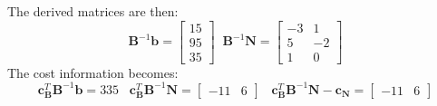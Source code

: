 \begin{example}
\begin{displaymath}
\end{displaymath}
The derived matrices are then:
\begin{displaymath}
\mathbf{B}^{-1}\mathbf{b} = \begin{bmatrix}15\\95\\35\end{bmatrix}\;\;
\mathbf{B}^{-1}\mathbf{N} = \begin{bmatrix}
-3 & 1\\
5 & -2\\
1 & 0
\end{bmatrix}
\end{displaymath}
The cost information becomes:
\begin{displaymath}
\mathbf{c}_\mathbf{B}^T\mathbf{B}^{-1}\mathbf{b} = 335 \;\;\;
\mathbf{c}_\mathbf{B}^T\mathbf{B}^{-1}\mathbf{N} = \begin{bmatrix}-11 & 6\end{bmatrix}\;\;\;
\mathbf{c}_\mathbf{B}^T\mathbf{B}^{-1}\mathbf{N} - \mathbf{c_N} = 
\begin{bmatrix}-11 & 6\end{bmatrix}
\end{displaymath}


\end{example}

